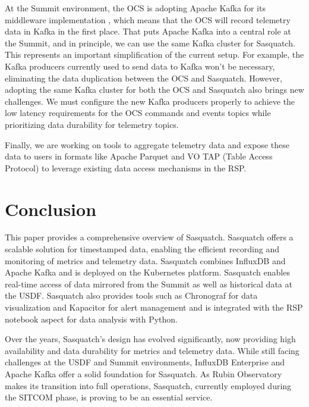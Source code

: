 At the Summit environment, the OCS is adopting Apache Kafka for its middleware implementation \cite{2024SPIE13101.59Ftmp, TSTN-033}, which means that the OCS will record telemetry data in Kafka in the first place. That puts Apache Kafka into a central role at the Summit, and in principle, we can use the same Kafka cluster for Sasquatch. This represents an important simplification of the current setup. For example, the Kafka producers currently used to send data to Kafka won't be necessary, eliminating the data duplication between the OCS and Sasquatch. However, adopting the same Kafka cluster for both the OCS and Sasquatch also brings new challenges. We must configure the new Kafka producers properly to achieve the low latency requirements for the OCS commands and events topics while prioritizing data durability for telemetry topics.

Finally, we are working on tools to aggregate telemetry \cite{SQR-058} data and expose these data to users in formats like Apache Parquet and VO TAP (Table Access Protocol) to leverage existing data access mechanisms in the RSP.

\section{Conclusion}

This paper provides a comprehensive overview of Sasquatch. Sasquatch offers a scalable solution for timestamped data, enabling the efficient recording and monitoring of metrics and telemetry data. Sasquatch combines InfluxDB and Apache Kafka and is deployed on the Kubernetes platform. Sasquatch enables real-time access of data mirrored from the Summit as well as historical data at the USDF. Sasquatch also provides tools such as Chronograf for data visualization and Kapacitor for alert management and is integrated with the RSP notebook aspect for data analysis with Python.

Over the years, Sasquatch's design has evolved significantly, now providing high availability and data durability for metrics and telemetry data. While still facing challenges at the USDF and Summit environments, InfluxDB Enterprise and Apache Kafka offer a solid foundation for Sasquatch. As Rubin Observatory makes its transition into full operations, Sasquatch, currently employed during the SITCOM phase, is proving to be an essential service.

\vskip 0.4in